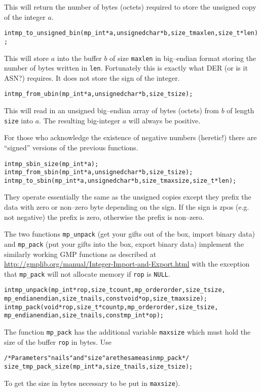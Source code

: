 \documentclass[synpaper]{book}
\begin{document}
This will return the number of bytes (octets) required to store the unsigned copy of the integer $a$.

\begin{alltt}
int mp_to_unsigned_bin(mp_int *a, unsigned char *b, size_t maxlen, size_t *len);
\end{alltt}
This will store $a$ into the buffer $b$ of size \texttt{maxlen} in big--endian format storing the number of bytes written in \texttt{len}.  Fortunately this is exactly what DER (or is it ASN?) requires.  It does not store the sign of the integer.

\begin{alltt}
int mp_from_ubin(mp_int *a, unsigned char *b, size_t size);
\end{alltt}
This will read in an unsigned big--endian array of bytes (octets) from $b$ of length \texttt{size} into $a$.  The resulting big-integer $a$ will always be positive.

For those who acknowledge the existence of negative numbers (heretic!) there are ``signed'' versions of the
previous functions.
  
\begin{alltt}
int mp_sbin_size(mp_int *a);
int mp_from_sbin(mp_int *a, unsigned char *b, size_t size);
int mp_to_sbin(mp_int *a, unsigned char *b, size_t maxsize, size_t *len);
\end{alltt}
They operate essentially the same as the unsigned copies except they prefix the data with zero or non--zero
byte depending on the sign.  If the sign is zpos (e.g. not negative) the prefix is zero, otherwise the prefix
is non--zero.

The two functions \texttt{mp\_unpack} (get your gifts out of the box, import binary data) and \texttt{mp\_pack} (put your gifts into the box, export binary data) implement the similarly working GMP functions as described at \url{http://gmplib.org/manual/Integer-Import-and-Export.html} with the exception that \texttt{mp\_pack} will not allocate memory if \texttt{rop} is \texttt{NULL}.
 
\begin{alltt}
int mp_unpack(mp_int *rop, size_t count, mp_order order, size_t size,
             mp_endian endian, size_t nails, const void *op, size_t maxsize);
int mp_pack(void *rop, size_t *countp, mp_order order, size_t size,
             mp_endian endian, size_t nails, const mp_int *op);
\end{alltt}
The function \texttt{mp\_pack} has the additional variable \texttt{maxsize} which must hold the size of the buffer \texttt{rop} in bytes. Use
\begin{alltt}
/* Parameters "nails" and "size" are the same as in mp_pack */
size_t mp_pack_size(mp_int *a, size_t nails, size_t size);
\end{alltt}
To get the size in bytes necessary to be put in \texttt{maxsize}).
\end{document}
